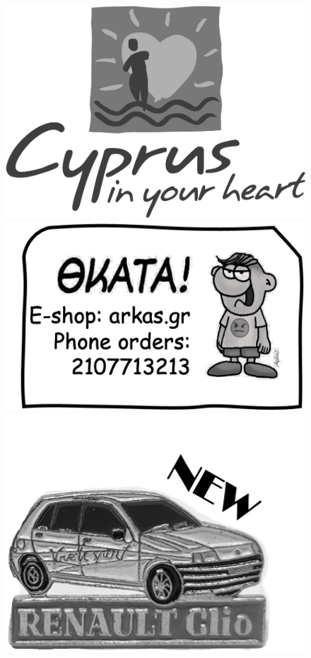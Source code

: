\begin{MyAd}[enhanced, tikz={rotate=0},  width=0.1\textwidth]{}%
  \begin{figure}
    \begin{center}
      \vspace{-0.5cm}
      \includegraphics[width=1.0\textwidth]{./figures/Cyprus-in-your-heart.png}
      \bigbreak
      \includegraphics[width=1.0\textwidth]{./figures/thkata.png}
      \bigbreak
      \includegraphics[width=1.0\textwidth]{./figures/car.png}

\end{center}
\end{figure}
\end{MyAd}
